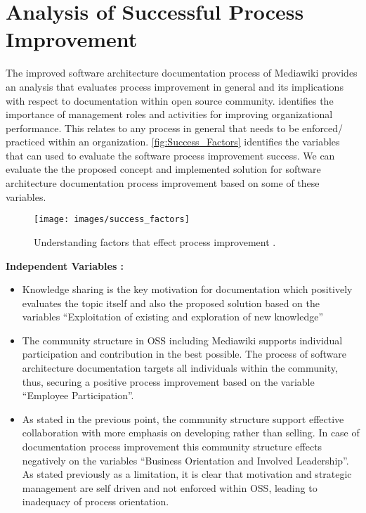 \section{Analysis of Successful Process Improvement}
The improved software architecture documentation process of Mediawiki provides an analysis that evaluates process improvement in general and its implications with respect to documentation within open source community. \cite{Dyba2005} identifies the importance of management roles and activities for improving organizational performance. This relates to any process in general that needs to be enforced/ practiced within an organization.
\newline
\autoref{fig:Success_Factors} identifies the variables that can used to evaluate the software process improvement success. We can evaluate the the proposed concept and implemented solution for software architecture documentation process improvement based on some of these variables.
\begin{figure}[H]
  \centering
  \texttt{[image: images/success\_factors]}
  \caption[Understanding factors that effect process improvement]{Understanding factors that effect process improvement \cite{Dyba2005}.}\label{fig:Success_Factors}
\end{figure}

\textbf{Independent Variables : } 
\begin{itemize}
\item Knowledge sharing is the key motivation for documentation which positively evaluates the topic itself and also the proposed solution based on the variables \enquote{Exploitation of existing and exploration of new knowledge}
\item The community structure in OSS including Mediawiki supports individual participation and contribution in the best possible. The process of software architecture documentation targets all individuals within the community, thus, securing a positive process improvement based on the variable \enquote{Employee Participation}.
\item As stated in the previous point, the community structure support effective collaboration with more emphasis on developing rather than selling. In case of documentation process improvement this community structure effects negatively on the variables \enquote{Business Orientation and Involved Leadership}. As stated previously as a limitation, it is clear that motivation and strategic management are self driven and not enforced within OSS, leading to inadequacy of process orientation.
\end{itemize}

